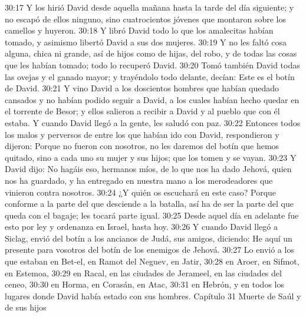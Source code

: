 30:17 Y los hirió David desde aquella mañana hasta la tarde del día siguiente; y no escapó de ellos ninguno, sino cuatrocientos jóvenes que montaron sobre los camellos y huyeron.  
30:18 Y libró David todo lo que los amalecitas habían tomado, y asimismo libertó David a sus dos mujeres.  
30:19 Y no les faltó cosa alguna, chica ni grande, así de hijos como de hijas, del robo, y de todas las cosas que les habían tomado; todo lo recuperó David.  
30:20 Tomó también David todas las ovejas y el ganado mayor; y trayéndolo todo delante, decían: Este es el botín de David.  
30:21 Y vino David a los doscientos hombres que habían quedado cansados y no habían podido seguir a David, a los cuales habían hecho quedar en el torrente de Besor; y ellos salieron a recibir a David y al pueblo que con él estaba. Y cuando David llegó a la gente, les saludó con paz.  
30:22 Entonces todos los malos y perversos de entre los que habían ido con David, respondieron y dijeron: Porque no fueron con nosotros, no les daremos del botín que hemos quitado, sino a cada uno su mujer y sus hijos; que los tomen y se vayan.  
30:23 Y David dijo: No hagáis eso, hermanos míos, de lo que nos ha dado Jehová, quien nos ha guardado, y ha entregado en nuestra mano a los merodeadores que vinieron contra nosotros.  
30:24 ¿Y quién os escuchará en este caso? Porque conforme a la parte del que desciende a la batalla, así ha de ser la parte del que queda con el bagaje; les tocará parte igual.  
30:25 Desde aquel día en adelante fue esto por ley y ordenanza en Israel, hasta hoy.  
30:26 Y cuando David llegó a Siclag, envió del botín a los ancianos de Judá, sus amigos, diciendo: He aquí un presente para vosotros del botín de los enemigos de Jehová.  
30:27 Lo envió a los que estaban en Bet-el, en Ramot del Neguev, en Jatir,  
30:28 en Aroer, en Sifmot, en Estemoa,  
30:29 en Racal, en las ciudades de Jerameel, en las ciudades del ceneo,  
30:30 en Horma, en Corasán, en Atac,  
30:31 en Hebrón, y en todos los lugares donde David había estado con sus hombres.  
Capítulo 31 
Muerte de Saúl y de sus hijos   

